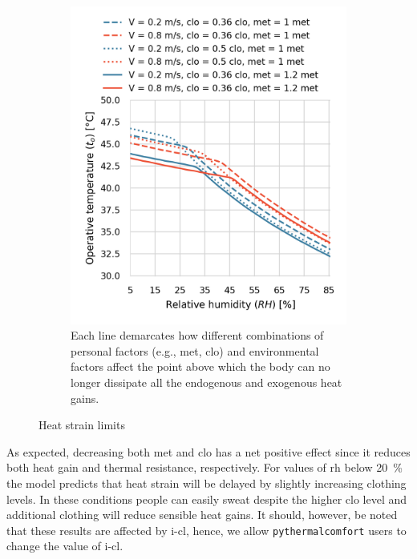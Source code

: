 \begin{figure}[hbt!]
    \hfill
    \begin{subfigure}[t]{0.47\textwidth}
    \centering
    \includegraphics[width=\textwidth]{figures/met_clo}
    \caption{Each line demarcates how different combinations of personal factors (e.g., \ac{met}, \ac{clo}) and environmental factors affect the point above which the body can no longer dissipate all the endogenous and exogenous heat gains.}
    \label{fig:met_clo}
    \end{subfigure}

    \caption{Heat strain limits}
    \label{fig:heat_strain_limits}

\end{figure}

As expected, decreasing both \ac{met} and \ac{clo} has a net positive effect since it reduces both heat gain and thermal resistance, respectively.
For values of \ac{rh} below 20~\% the model predicts that heat strain will be delayed by slightly increasing clothing levels.
In these conditions people can easily sweat despite the higher clo level and additional clothing will reduce sensible heat gains.
It should, however, be noted that these results are affected by \ac{i-cl}, hence, we allow \verb|pythermalcomfort| users to change the value of \ac{i-cl}.

